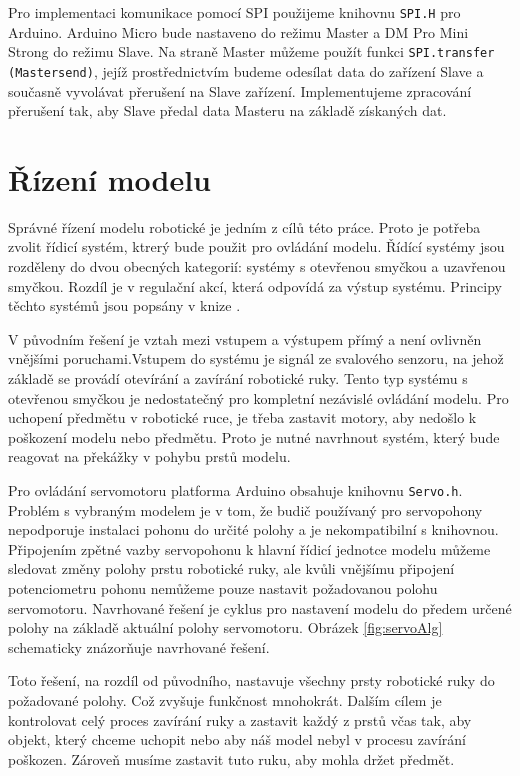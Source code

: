\documentclass[thesis=B,czech]{FITthesis}[2012/06/26]
\begin{document}
 
 Pro implementaci komunikace pomocí SPI použijeme knihovnu \texttt{SPI.H} pro Arduino. Arduino Micro bude nastaveno do režimu Master a DM Pro Mini Strong do režimu Slave. Na straně Master můžeme použít funkci \texttt{SPI.transfer (Mastersend)}, jejíž prostřednictvím budeme odesílat data do zařízení Slave a současně vyvolávat přerušení na Slave zařízení. Implementujeme zpracování přerušení tak, aby Slave předal data Masteru na základě získaných dat.
 

\section{Řízení modelu}

Správné řízení modelu robotické je jedním z cílů této práce. Proto je potřeba zvolit řídicí systém, ktrerý bude použit pro ovládání modelu. Řídící systémy jsou rozděleny do dvou obecných kategorií: systémy s otevřenou smyčkou a uzavřenou smyčkou. Rozdíl je v regulační akcí, která odpovídá za výstup systému. Principy těchto systémů jsou popsány v knize \cite{contrSyst}.

V původním řešení je vztah mezi vstupem a výstupem přímý a není ovlivněn vnějšími poruchami.Vstupem do systému je signál ze svalového senzoru, na jehož základě se provádí otevírání a zavírání robotické ruky. Tento typ systému s otevřenou smyčkou je nedostatečný pro kompletní nezávislé ovládání modelu. Pro uchopení předmětu v robotické ruce, je třeba zastavit motory, aby nedošlo k poškození modelu nebo předmětu. Proto je nutné navrhnout systém, který bude reagovat na překážky v pohybu prstů modelu.

Pro ovládání servomotoru platforma Arduino obsahuje knihovnu \texttt{Servo.h}. Problém s vybraným modelem je v tom, že budič používaný pro servopohony nepodporuje instalaci pohonu do určité polohy a je nekompatibilní s knihovnou. Připojením zpětné vazby servopohonu k hlavní řídicí jednotce modelu můžeme sledovat změny polohy prstu robotické ruky, ale kvůli vnějšímu připojení potenciometru pohonu nemůžeme pouze nastavit požadovanou polohu servomotoru. Navrhované řešení je cyklus pro nastavení modelu do předem určené polohy na základě aktuální polohy servomotoru. Obrázek \ref{fig:servoAlg} schematicky znázorňuje navrhované řešení.

Toto řešení, na rozdíl od původního, nastavuje všechny prsty robotické ruky do požadované polohy. Což zvyšuje funkčnost mnohokrát. Dalším cílem je kontrolovat celý proces zavírání ruky a zastavit každý z prstů včas tak, aby objekt, který chceme uchopit nebo aby náš model nebyl v procesu zavírání poškozen. Zároveň musíme zastavit tuto ruku, aby mohla držet předmět. 
\end{document}
